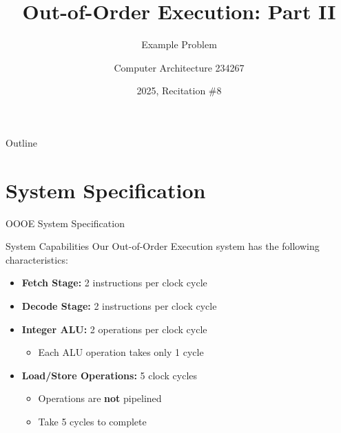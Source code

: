 \documentclass[aspectratio=169,12pt]{beamer}
\title{Out-of-Order Execution: Part II}
\subtitle{Example Problem}
\author{Computer Architecture 234267}
\date{2025, Recitation \#8}
\begin{document}
\begin{frame}
\titlepage
\end{frame}

\begin{frame}{Outline}
\tableofcontents
\end{frame}

\section{System Specification}

\begin{frame}{OOOE System Specification}
\begin{block}{System Capabilities}
Our Out-of-Order Execution system has the following characteristics:
\end{block}

\begin{itemize}
    \item \textbf{Fetch Stage:} 2 instructions per clock cycle
    \item \textbf{Decode Stage:} 2 instructions per clock cycle  
    \item \textbf{Integer ALU:} 2 operations per clock cycle
    \begin{itemize}
        \item Each ALU operation takes only 1 cycle
    \end{itemize}
    \item \textbf{Load/Store Operations:} 5 clock cycles
    \begin{itemize}
        \item Operations are \textbf{not} pipelined
        \item Take 5 cycles to complete
    \end{itemize}
\end{itemize}
\end{frame}
\end{document}
